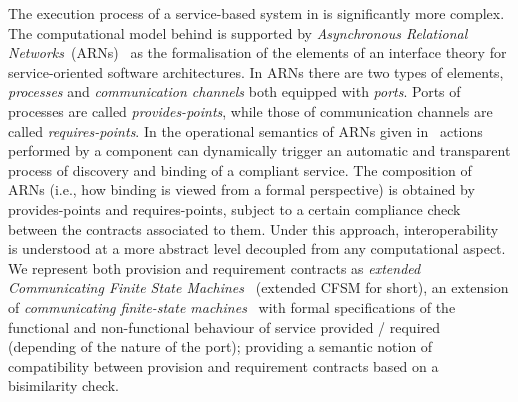 The execution process of a service-based system in \SEArch is significantly more complex.
%
The computational model behind \SEArch is supported by \emph{Asynchronous Relational Networks}~(ARNs)~\cite{fiadeiro:tcs-503} as the formalisation of the elements of an interface theory for service-oriented software architectures. 
%
  In ARNs there are two types of elements, \emph{processes} and
  \emph{communication channels} both equipped with \emph{ports}.
%
  Ports of processes are called \emph{provides-points},
  while those of communication channels are called
  \emph{requires-points}.
  In the operational semantics of ARNs given
  in~\cite{vissani:wadt14-f} actions performed by a component can
  dynamically trigger an automatic and transparent process of
  discovery and binding of a compliant service.
%
The composition of ARNs (i.e., how binding is viewed from a formal perspective) is obtained by  provides-points and requires-points, subject to a certain compliance check between the contracts associated to them. Under this approach, interoperability is understood at a more abstract level decoupled from any computational aspect.
%
We represent both provision and requirement contracts as \emph{extended Communicating Finite State Machines}~\cite{lopezpombo:coordination25} (extended CFSM for short), an extension of \emph{communicating finite-state machines}~\cite{brand:jacm-30_2} with formal specifications of the functional and non-functional behaviour of service provided / required (depending of the nature of the port); providing a semantic notion of compatibility between provision and
requirement contracts based on a bisimilarity check.

